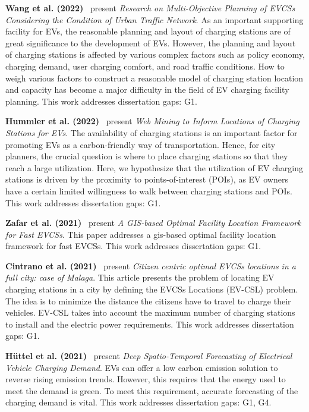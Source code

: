 \documentclass[letterpaper, 12pt, oneside, doublespacing]{Thesis}
\begin{document}
\noindent \textbf{Wang et al. (2022)}~\cite{research_on_2022} present \textit{Research on Multi-Objective Planning of EVCSs Considering the Condition of Urban Traffic Network}. As an important supporting facility for EVs, the reasonable planning and layout of charging stations are of great significance to the development of EVs. However, the planning and layout of charging stations is affected by various complex factors such as policy economy, charging demand, user charging comfort, and road traffic conditions. How to weigh various factors to construct a reasonable model of charging station location and capacity has become a major difficulty in the field of EV charging facility planning. This work addresses dissertation gaps: G1.



\noindent \textbf{Hummler et al. (2022)}~\cite{web_mining_2022} present \textit{Web Mining to Inform Locations of Charging Stations for EVs}. The availability of charging stations is an important factor for promoting EVs as a carbon-friendly way of transportation. Hence, for city planners, the crucial question is where to place charging stations so that they reach a large utilization. Here, we hypothesize that the utilization of EV charging stations is driven by the proximity to points-of-interest (POIs), as EV owners have a certain limited willingness to walk between charging stations and POIs. This work addresses dissertation gaps: G1.



\noindent \textbf{Zafar et al. (2021)}~\cite{a_gis-based_2021} present \textit{A GIS-based Optimal Facility Location Framework for Fast EVCSs}. This paper addresses a gis-based optimal facility location framework for fast EVCSs. This work addresses dissertation gaps: G1.



\noindent \textbf{Cintrano et al. (2021)}~\cite{citizen_centric_2021} present \textit{Citizen centric optimal EVCSs locations in a full city: case of Malaga}. This article presents the problem of locating EV charging stations in a city by defining the EVCSs Locations (EV-CSL) problem. The idea is to minimize the distance the citizens have to travel to charge their vehicles. EV-CSL takes into account the maximum number of charging stations to install and the electric power requirements. This work addresses dissertation gaps: G1.



\noindent \textbf{H\"uttel et al. (2021)}~\cite{deep_spatio-temporal_2021} present \textit{Deep Spatio-Temporal Forecasting of Electrical Vehicle Charging Demand}. EVs can offer a low carbon emission solution to reverse rising emission trends. However, this requires that the energy used to meet the demand is green. To meet this requirement, accurate forecasting of the charging demand is vital. This work addresses dissertation gaps: G1, G4.
\end{document}
